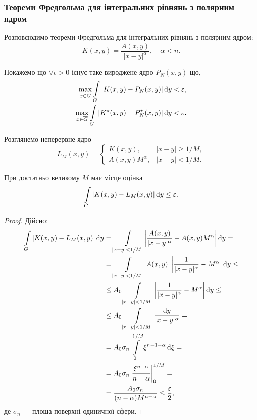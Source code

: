 \subsubsection{Теореми Фредгольма для інтегральних рівнянь з полярним ядром}

Розповсюдимо теореми Фредгольма для інтегральних рівнянь з полярним ядром:
\begin{equation}
	K(x, y) = \dfrac{A(x, y)}{|x - y|^\alpha}, \quad \alpha < n.
\end{equation}

Покажемо що $\forall \epsilon > 0$ існує таке вироджене ядро $P_N(x, y)$ що,
\begin{align}
	\displaystyle\max\limits_{x \in \overline G} \displaystyle\int\limits_G |K(x, y) - P_N(x, y)| \mathop{}\!\mathrm{d} y &< \varepsilon, \\
	\displaystyle\max\limits_{x \in \overline G} \displaystyle\int\limits_G |K^\star (x, y) - P_N^\star (x, y)| \mathop{}\!\mathrm{d} y &< \varepsilon.
\end{align}

Розглянемо неперервне ядро
\begin{equation}
	L_M(x, y) = \begin{cases}
		K(x, y), & |x - y| \ge 1 / M, \\
		A(x, y) M^\alpha, & |x - y| < 1 / M.
	\end{cases}
\end{equation}

\begin{proposition}
	При достатньо великому $M$ має місце оцінка
	\begin{equation}
		\displaystyle\int\limits_G |K(x, y) - L_M(x, y)| \mathop{}\!\mathrm{d} y \le \varepsilon.
	\end{equation}
\end{proposition}

\begin{proof}
	Дійсно:
	\begin{equation}
		\begin{aligned}
			\displaystyle\int\limits_G |K(x, y) - L_M(x, y)| \mathop{}\!\mathrm{d} y &= \displaystyle\int\limits_{|x - y| < 1 / M} \left| \dfrac{A(x, y)}{|x - y|^\alpha} - A(x, y) M^\alpha \right| \mathop{}\!\mathrm{d} y = \\
			&= \displaystyle\int\limits_{|x - y| < 1 /M} |A(x, y)| \left| \dfrac{1}{|x - y|^\alpha} - M^\alpha \right| \mathop{}\!\mathrm{d} y \le \\
			&\le A_0 \displaystyle\int\limits_{|x - y| < 1 / M} \left| \dfrac{1}{|x - y|^\alpha} - M^\alpha \right| \mathop{}\!\mathrm{d} y \le \\
			&\le A_0 \displaystyle\int\limits_{|x - y| < 1 / M} \dfrac{\mathop{}\!\mathrm{d} y}{|x - y|^\alpha} = \\
			&= A_0 \sigma_n \displaystyle\int\limits_0^{1 / M} \xi^{n - 1 - \alpha} \mathop{}\!\mathrm{d} \xi = \\
			&= A_0 \sigma_n \left.\dfrac{\xi^{n - \alpha}}{n - \alpha}\right|_0^{1 / M} = \\
			&= \dfrac{A_0\sigma_n}{(n - \alpha)M^{n - \alpha}} \le \dfrac{\varepsilon}{2},
		\end{aligned}
	\end{equation}
	де $\sigma_n$ --- площа поверхні одиничної сфери.
\end{proof}

